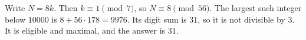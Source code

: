 Write $N=8k$. Then $k\equiv1\pmod7$, so $N\equiv8\pmod{56}$. The largest such integer below $10000$ is $8+56\cdot178=9976$. Its digit sum is $31$, so it is not divisible by $3$. It is eligible and maximal, and the answer is $\boxed{31}$.
